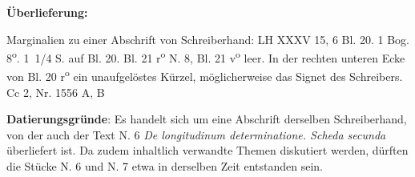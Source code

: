    
        
        \begin{ledgroupsized}[r]{120mm}
        \footnotesize 
        \pstart        
        \noindent\textbf{\"{U}berlieferung:}  
        \pend
        \end{ledgroupsized}
      
       
              \begin{ledgroupsized}[r]{114mm}
              \footnotesize 
              \pstart \parindent -6mm
              Marginalien zu einer Abschrift von Schreiberhand: LH XXXV 15, 6 Bl. 20. 1 Bog. 8\textsuperscript{o}. 1~1/4 S. auf Bl. 20. Bl. 21 r\textsuperscript{o} N. 8, Bl. 21 v\textsuperscript{o} leer. In der rechten unteren Ecke von Bl. 20 r\textsuperscript{o} ein unaufgel\"{o}stes K\"{u}rzel, m\"{o}glicherweise das Signet des Schreibers.\\Cc 2, Nr. 1556 A, B \pend
              \end{ledgroupsized}
        \vspace*{5mm}
        \begin{ledgroup}
        \footnotesize 
        \pstart
      \noindent\footnotesize{\textbf{Datierungsgr\"{u}nde}: Es handelt sich um eine Abschrift derselben Schreiberhand, von der auch der Text N. 6 \textit{De longitudinum determinatione. Scheda secunda} \"{u}berliefert ist. Da zudem inhaltlich verwandte Themen diskutiert werden, d\"{u}rften die St\"{u}cke N. 6 und N. 7 etwa in derselben Zeit entstanden sein.}
        \pend
        \end{ledgroup}
      
